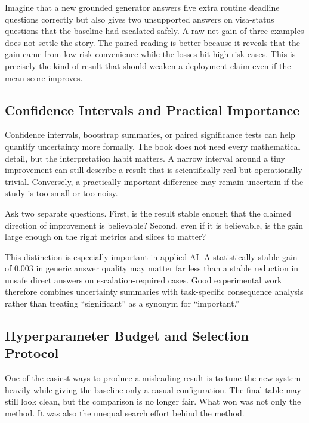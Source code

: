 \begin{example}
Imagine that a new grounded generator answers five extra routine deadline questions correctly but also gives two unsupported answers on visa-status questions that the baseline had escalated safely. A raw net gain of three examples does not settle the story. The paired reading is better because it reveals that the gain came from low-risk convenience while the losses hit high-risk cases. This is precisely the kind of result that should weaken a deployment claim even if the mean score improves.
\end{example}

\subsection{Confidence Intervals and Practical Importance}

Confidence intervals, bootstrap summaries, or paired significance tests can help quantify uncertainty more formally. The book does not need every mathematical detail, but the interpretation habit matters. A narrow interval around a tiny improvement can still describe a result that is scientifically real but operationally trivial. Conversely, a practically important difference may remain uncertain if the study is too small or too noisy.

\begin{decisionbox}
Ask two separate questions. First, is the result stable enough that the claimed direction of improvement is believable? Second, even if it is believable, is the gain large enough on the right metrics and slices to matter?
\end{decisionbox}

This distinction is especially important in applied AI. A statistically stable gain of $0.003$ in generic answer quality may matter far less than a stable reduction in unsafe direct answers on escalation-required cases. Good experimental work therefore combines uncertainty summaries with task-specific consequence analysis rather than treating ``significant'' as a synonym for ``important.''

\subsection{Hyperparameter Budget and Selection Protocol}

One of the easiest ways to produce a misleading result is to tune the new system heavily while giving the baseline only a casual configuration. The final table may still look clean, but the comparison is no longer fair. What won was not only the method. It was also the unequal search effort behind the method.

